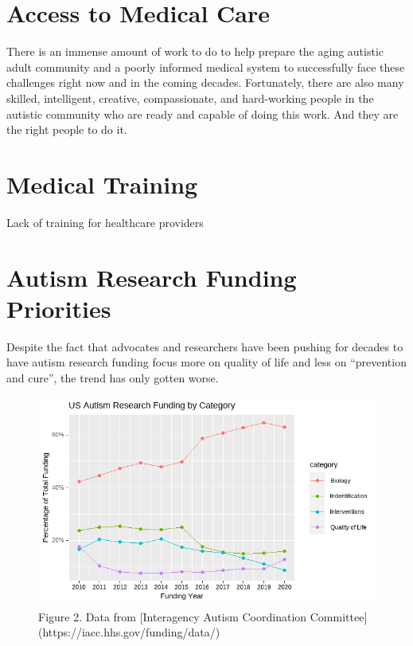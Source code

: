 \documentclass[
  letterpaper,
  DIV=11,
  numbers=noendperiod]{scrreprt}
\begin{document}
\section{Access to Medical Care}\label{sec-access_to_care}

There is an immense amount of work to do to help prepare the aging
autistic adult community and a poorly informed medical system to
successfully face these challenges right now and in the coming decades.
Fortunately, there are also many skilled, intelligent, creative,
compassionate, and hard-working people in the autistic community who are
ready and capable of doing this work. And they are the right people to
do it.

\section{Medical Training}\label{sec-training_for_providers}

Lack of training for healthcare providers

\section{Autism Research Funding
Priorities}\label{sec-research_funding_providers}

Despite the fact that advocates and researchers have been pushing for
decades to have autism research funding focus more on quality of life
and less on ``prevention and cure'', the trend has only gotten worse.

\begin{figure}

{\centering \includegraphics[width=5.4811in,height=\textheight]{./media/image1.png}

}

\caption{Figure 2. Data from {[}Interagency Autism Coordination
Committee{]}(https://iacc.hhs.gov/funding/data/)}

\end{figure}%
\end{document}
